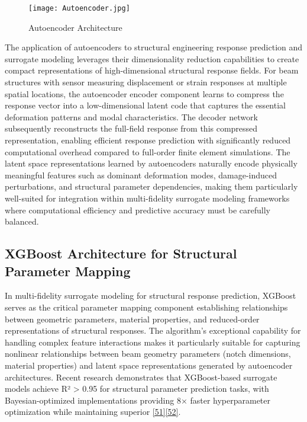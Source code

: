 \documentclass[12pt,a4paper]{report}
\begin{document}
\begin{figure}[htbp]
\centering
\texttt{[image: Autoencoder.jpg]}
\caption{Autoencoder Architecture}
\label{fig:autoencoder_architecture}
\end{figure}

The application of autoencoders to structural engineering response prediction and surrogate modeling leverages their dimensionality reduction capabilities to create compact representations of high-dimensional structural response fields. For beam structures with sensor measuring displacement or strain responses at multiple spatial locations, the autoencoder encoder component learns to compress the response vector into a low-dimensional latent code that captures the essential deformation patterns and modal characteristics. The decoder network subsequently reconstructs the full-field response from this compressed representation, enabling efficient response prediction with significantly reduced computational overhead compared to full-order finite element simulations. The latent space representations learned by autoencoders naturally encode physically meaningful features such as dominant deformation modes, damage-induced perturbations, and structural parameter dependencies, making them particularly well-suited for integration within multi-fidelity surrogate modeling frameworks where computational efficiency and predictive accuracy must be carefully balanced.



\subsection{XGBoost Architecture for Structural Parameter Mapping}

In multi-fidelity surrogate modeling for structural response prediction, XGBoost serves as the critical parameter mapping component establishing relationships between geometric parameters, material properties, and reduced-order representations of structural responses. The algorithm's exceptional capability for handling complex feature interactions makes it particularly suitable for capturing nonlinear relationships between beam geometry parameters (notch dimensions, material properties) and latent space representations generated by autoencoder architectures. Recent research demonstrates that XGBoost-based surrogate models achieve R² > 0.95 for structural parameter prediction tasks, with Bayesian-optimized implementations providing 8× faster hyperparameter optimization while maintaining superior \href{https://www.sciencedirect.com/science/article/pii/S0141029623017224}{[51]}\href{https://www.mdpi.com/2076-3417/14/5/2127}{[52]}.
\end{document}
